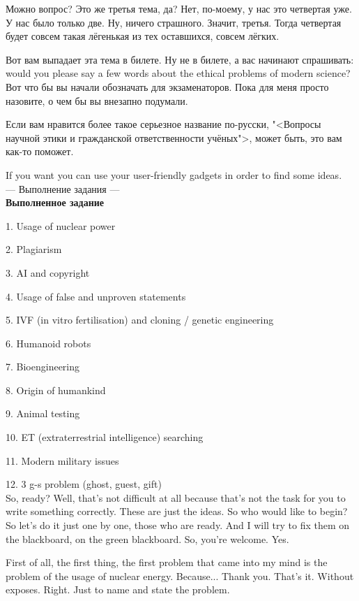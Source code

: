 \documentclass[main.tex]{subfiles}
\begin{document}
Можно вопрос? Это же третья тема, да? Нет, по-моему, у нас это четвертая уже.
У нас было только две.
Ну, ничего страшного.
Значит, третья.
Тогда четвертая будет совсем такая лёгенькая из тех оставшихся, совсем лёгких.

Вот вам выпадает эта тема в билете.
Ну не в билете, а вас начинают спрашивать: would you please say a few words about the ethical problems of modern science?
Вот что бы вы начали обозначать для экзаменаторов.
Пока для меня просто назовите, о чем бы вы внезапно подумали.

Если вам нравится более такое серьезное название по-русски, "<Вопросы научной этики и гражданской ответственности учёных">, может быть, это вам как-то поможет.

If you want you can use your user-friendly gadgets in order to find some ideas.
\\

--- Выполнение задания ---
\\

\textbf{Выполненное задание}

1. Usage of nuclear power

2. Plagiarism

3. AI and copyright

4. Usage of false and unproven statements

5. IVF (in vitro fertilisation) and cloning / genetic engineering

6. Humanoid robots

7. Bioengineering

8. Origin of humankind

9. Animal testing

10. ET (extraterrestrial intelligence) searching

11. Modern military issues

12. 3 g-s problem (ghost, guest, gift)
\\

So, ready?
Well, that's not difficult at all because that's not the task for you to write something correctly.
These are just the ideas.
So who would like to begin?
So let's do it just one by one, those who are ready.
And I will try to fix them on the blackboard, on the green blackboard.
So, you're welcome.
Yes.

First of all, the first thing, the first problem that came into my mind is the problem of the usage of nuclear energy.
Because... Thank you. That's it. Without exposes. Right. Just to name and state the problem.
\end{document}
